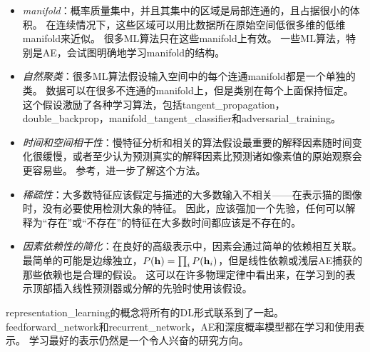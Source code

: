 \begin{itemize}
	\item \emph{\gls{manifold}}：概率质量集中，并且其集中的区域是局部连通的，且占据很小的体积。
	在连续情况下，这些区域可以用比数据所在原始空间低很多维的低维\gls{manifold}来近似。
	很多\gls{ML}算法只在这些\gls{manifold}上有效\citep{Goodfellow-2015-adversarial}。
	一些\gls{ML}算法，特别是\gls{AE}，会试图明确地学习\gls{manifold}的结构。


	\item \emph{自然聚类}：很多\gls{ML}算法假设输入空间中的每个连通\gls{manifold}都是一个单独的类。
	数据可以在很多不连通的\gls{manifold}上，但是类别在每个上面保持恒定。
	这个假设激励了各种学习算法，包括\gls{tangent_propagation}，\gls{double_backprop}，\gls{manifold_tangent_classifier}和\gls{adversarial_training}。


	\item \emph{时间和空间相干性}：慢特征分析和相关的算法假设最重要的解释因素随时间变化很缓慢，或者至少认为预测真实的解释因素比预测诸如像素值的原始观察会更容易些。
	参考，进一步了解这个方法。


	\item \emph{稀疏性}：大多数特征应该假定与描述的大多数输入不相关——在表示猫的图像时，没有必要使用检测大象的特征。
	因此，应该强加一个先验，任何可以解释为``存在''或``不存在''的特征在大多数时间都应该是不存在的。


	\item \emph{因素依赖性的简化}：在良好的高级表示中，因素会通过简单的依赖相互关联。
	最简单的可能是边缘独立，$P(\mathbf{h}) = \prod_i P(\mathbf{h}_i)$，但是线性依赖或浅层\gls{AE}捕获的那些依赖也是合理的假设。
	这可以在许多物理定律中看出来，在学习到的表示顶部插入线性预测器或分解的先验时使用该假设。
\end{itemize}


\gls{representation_learning}的概念将所有的\gls{DL}形式联系到了一起。
\gls{feedforward_network}和\gls{recurrent_network}，\gls{AE}和深度概率模型都在学习和使用表示。
学习最好的表示仍然是一个令人兴奋的研究方向。

